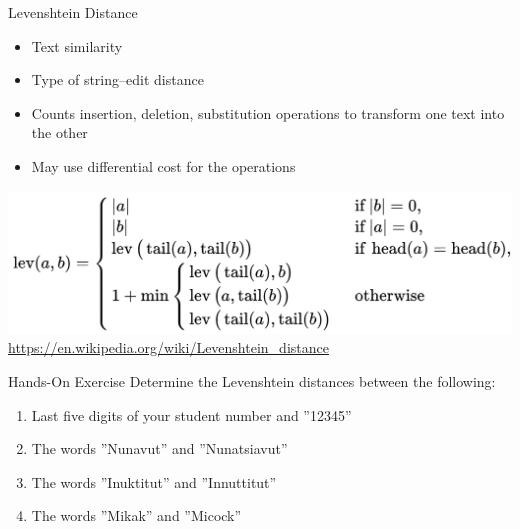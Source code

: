 \documentclass[ignorenonframetext,xcolor=x11names]{beamer}
\begin{document}
\begin{frame}{Levenshtein Distance}

\begin{itemize}
  \item Text similarity
  \item Type of string--edit distance
  \item Counts insertion, deletion, substitution operations to transform one text into the other
  \item May use differential cost for the operations
\end{itemize}
\centering

\includegraphics[width=\textwidth]{screen6.png}
\scriptsize
\url{https://en.wikipedia.org/wiki/Levenshtein_distance}
\end{frame}

\begin{frame}{Hands-On Exercise}
Determine the Levenshtein distances between the following:
\begin{enumerate}
  \item Last five digits of your student number and ''12345''
  \item The words ''Nunavut'' and ''Nunatsiavut''
  \item The words ''Inuktitut'' and ''Innuttitut''
  \item The words ''Mikak'' and ''Micock''
\end{enumerate}
\end{frame}
\end{document}
